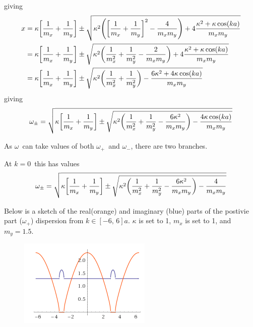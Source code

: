 \documentclass[12p,a4paper]{article}
\begin{document}
giving
\begin{align*}
    x &= \kappa\qty[\frac{1}{m_x} + \frac{1}{m_y}] \pm \sqrt{\kappa^2\qty(\qty[\frac{1}{m_x} + \frac{1}{m_y}]^2 - \frac{4}{m_x m_y}) + 4\frac{\kappa^2 + \kappa\cos(ka)}{m_xm_y} } \\
    &= \kappa\qty[\frac{1}{m_x} + \frac{1}{m_y}] \pm \sqrt{\kappa^2\qty(\frac{1}{m_x^2} + \frac{1}{m_y^2} - \frac{2}{m_x m_y}) + 4\frac{\kappa^2 + \kappa\cos(ka)}{m_xm_y} } \\
    &= \kappa\qty[\frac{1}{m_x} + \frac{1}{m_y}] \pm \sqrt{\kappa^2\qty(\frac{1}{m_x^2} + \frac{1}{m_y^2}) - \frac{6\kappa^2 + 4 \kappa\cos(ka)}{m_x m_y} }
\end{align*}
giving
\begin{align*}
    \omega_\pm =  \sqrt{\kappa\qty[\frac{1}{m_x} + \frac{1}{m_y}] \pm \sqrt{\kappa^2\qty(\frac{1}{m_x^2} + \frac{1}{m_y^2} - \frac{6\kappa^2}{m_xm_y}) - \frac{4 \kappa\cos(ka)}{m_x m_y} }}
\end{align*}

As $\omega$ can take values of both $\omega_+$ and $\omega_-$, there are two branches.

At $k=0$ this has values
\begin{align*}
    \omega_\pm =  \sqrt{\kappa\qty[\frac{1}{m_x} + \frac{1}{m_y}] \pm \sqrt{\kappa^2\qty(\frac{1}{m_x^2} + \frac{1}{m_y^2} - \frac{6\kappa^2}{m_xm_y}) - \frac{4}{m_x m_y} }}
\end{align*}

Below is a sketch of the real(orange) and imaginary (blue) parts of the postivie part ($\omega_+$) dispersion from $k \in [-6,\, 6]a$. $\kappa$ is set to 1, $m_x$ is set to 1, and $m_y = 1.5$.
\begin{figure}[H]
    \includegraphics[width=0.4\linewidth]{img.png}
\end{figure}
\end{document}
